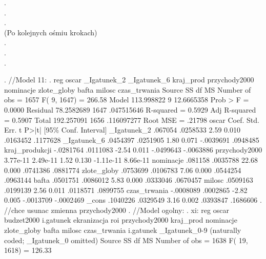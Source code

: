 \vspace{1cm}
{\centering .\\.\\.\\(Po kolejnych ośmiu krokach)\\.\\.\\.\\}
\vspace{1cm}
\begin{stlog}

. //Model 11:
. reg oscar _Igatunek_2 _Igatunek_6 kraj_prod przychody2000 nominacje zlote_globy bafta milosc czas_trwania
{\smallskip}
      Source {\VBAR}       SS       df       MS              Number of obs =    1657
           F(  9,  1647) =  266.58
       Model {\VBAR}  113.998822     9  12.6665358           Prob > F      =  0.0000
    Residual {\VBAR}  78.2582689  1647  .047515646           R-squared     =  0.5929
           Adj R-squared =  0.5907
       Total {\VBAR}  192.257091  1656  .116097277           Root MSE      =  .21798
{\smallskip}
         oscar {\VBAR}      Coef.   Std. Err.      t    P>|t|     [95\% Conf. Interval]
   _Igatunek_2 {\VBAR}    .067054   .0258533     2.59   0.010     .0163452    .1177628
   _Igatunek_6 {\VBAR}   .0454397   .0251905     1.80   0.071    -.0039691    .0948485
kraj_produkcji {\VBAR}  -.0281764   .0111083    -2.54   0.011    -.0499643   -.0063886
 przychody2000 {\VBAR}   3.77e-11   2.49e-11     1.52   0.130    -1.11e-11    8.66e-11
     nominacje {\VBAR}    .081158   .0035788    22.68   0.000     .0741386    .0881774
   zlote_globy {\VBAR}   .0753699   .0106783     7.06   0.000     .0544254    .0963144
         bafta {\VBAR}   .0501751   .0086012     5.83   0.000     .0333046    .0670457
        milosc {\VBAR}   .0509163   .0199139     2.56   0.011     .0118571    .0899755
  czas_trwania {\VBAR}  -.0008089   .0002865    -2.82   0.005    -.0013709   -.0002469
         _cons {\VBAR}   .1040226   .0329549     3.16   0.002     .0393847    .1686606
{\smallskip}
. //chce usunac zmienna przychody2000
. //Model ogolny:
. xi: reg oscar  budzet2000 i.gatunek ekranizacja roi przychody2000 kraj_prod nominacje zlote_globy bafta
 milosc czas_trwania
i.gatunek         _Igatunek_0-9       (naturally coded; _Igatunek_0 omitted)
{\smallskip}
      Source {\VBAR}       SS       df       MS              Number of obs =    1638
           F( 19,  1618) =  126.33

\end{stlog}
